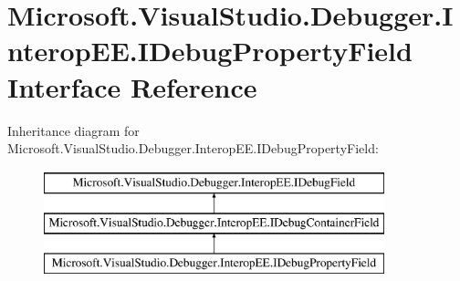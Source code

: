 \hypertarget{interface_microsoft_1_1_visual_studio_1_1_debugger_1_1_interop_e_e_1_1_i_debug_property_field}{\section{Microsoft.\+Visual\+Studio.\+Debugger.\+Interop\+E\+E.\+I\+Debug\+Property\+Field Interface Reference}
\label{interface_microsoft_1_1_visual_studio_1_1_debugger_1_1_interop_e_e_1_1_i_debug_property_field}
}
Inheritance diagram for Microsoft.\+Visual\+Studio.\+Debugger.\+Interop\+E\+E.\+I\+Debug\+Property\+Field\+:\begin{figure}[H]
\begin{center}
\leavevmode
\includegraphics[height=3.000000cm]{interface_microsoft_1_1_visual_studio_1_1_debugger_1_1_interop_e_e_1_1_i_debug_property_field}
\end{center}
\end{figure}
